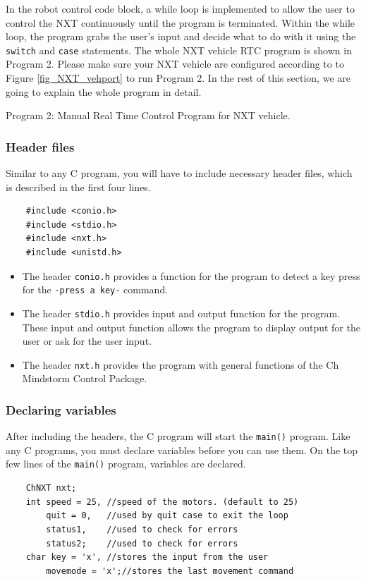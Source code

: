 \noindent
In the robot control code block, a while loop is implemented to allow the user to control the NXT
continuously until the program is terminated. Within the while loop, the program grabs the user's 
input and decide what to do with it using the \verb+switch+ and \verb+case+ statements.
The whole NXT vehicle RTC program is shown in Program 2. Please make sure your NXT vehicle are 
configured according to to Figure \ref{fig_NXT_vehport} to run Program 2. In the rest of this 
section, we are going to explain the whole program in detail.


\begin{center}
Program 2: Manual Real Time Control Program for NXT vehicle.
\end{center}

\subsubsection*{Header files}
Similar to any C program, you will have to include necessary header files, which is described in the 
first four lines.
    
\begin{verbatim}
    #include <conio.h>
    #include <stdio.h>
    #include <nxt.h>
    #include <unistd.h>
\end{verbatim}

\begin{itemize}
\item The header \verb+conio.h+ provides a function for the program to detect a key press for the
\verb+-press a key-+ command.
\item The header \verb+stdio.h+ provides input and output function for the program. These input and 
output function allows the program to display output for the user or ask for the user input.
\item The header \verb+nxt.h+ provides the program with general functions of the Ch Mindstorm 
Control Package.
\end{itemize}

\subsubsection*{Declaring variables}
After including the headers, the C program will start the \verb+main()+ program.
Like any C programs, you must declare variables before you can use them.
On the top few lines of the \verb+main()+ program, variables are declared.
\begin{verbatim}
    ChNXT nxt;
    int speed = 25,	//speed of the motors. (default to 25)
        quit = 0,	//used by quit case to exit the loop
        status1,	//used to check for errors
        status2;	//used to check for errors
    char key = 'x',	//stores the input from the user
        movemode = 'x';//stores the last movement command
\end{verbatim}

